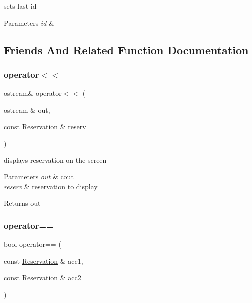 sets last id 


\begin{DoxyParams}{Parameters}
{\em id} & \\
\hline
\end{DoxyParams}


\subsection{Friends And Related Function Documentation}
\hypertarget{class_reservation_ad08627b6936df4b1b1a5c0351355ffbe}{}\label{class_reservation_ad08627b6936df4b1b1a5c0351355ffbe} 
\subsubsection{\texorpdfstring{operator$<$$<$}{operator<<}}
{\footnotesize\ttfamily ostream\& operator$<$$<$ (\begin{DoxyParamCaption}\item[{ostream \&}]{out,  }\item[{const \hyperlink{class_reservation}{Reservation} \&}]{reserv }\end{DoxyParamCaption})\hspace{0.3cm}{\ttfamily [friend]}}



displays reservation on the screen 


\begin{DoxyParams}{Parameters}
{\em out} & cout\\
\hline
{\em reserv} & reservation to display\\
\hline
\end{DoxyParams}
\begin{DoxyReturn}{Returns}
out 
\end{DoxyReturn}
\hypertarget{class_reservation_aedba0fd671214e780c8933b23585b0c9}{}\label{class_reservation_aedba0fd671214e780c8933b23585b0c9} 
\subsubsection{\texorpdfstring{operator==}{operator==}}
{\footnotesize\ttfamily bool operator== (\begin{DoxyParamCaption}\item[{const \hyperlink{class_reservation}{Reservation} \&}]{acc1,  }\item[{const \hyperlink{class_reservation}{Reservation} \&}]{acc2 }\end{DoxyParamCaption})\hspace{0.3cm}{\ttfamily [friend]}}



